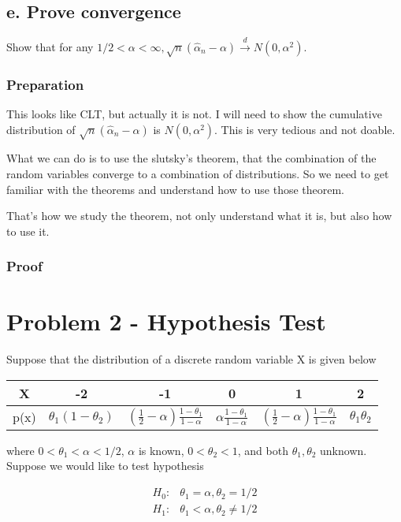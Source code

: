 \subsection{e. Prove convergence}
Show that for any $1/2 < \alpha < \infty, \sqrt{n} (\hat{\alpha}_n - \alpha) \xrightarrow {d} N(0, \alpha^2)$.

\subsubsection{Preparation}
This looks like CLT, but actually it is not. I will need to show the cumulative distribution of $\sqrt{n} (\hat{\alpha}_n - \alpha) $ is $N(0, \alpha^2)$. This is very tedious and not doable. 

What we can do is to use the slutsky's theorem, that the combination of the random variables converge to a combination of distributions. So we need to get familiar with the theorems and understand how to use those theorem. 

That's how we study the theorem, not only understand what it is, but also how to use it.

\subsubsection{Proof}



\section{Problem 2 - Hypothesis Test}
Suppose that the distribution of a discrete random variable X is given below

\begin{center}
\begin{tabular}{ c c c c c c}
 X & -2 & -1 & 0 & 1 & 2 \\ 
 \hline
p(x) & $\theta_1(1-\theta_2)$ & $(\frac{1}{2} - \alpha) \frac{1-\theta_1}{1-\alpha} $ & $ \alpha \frac{1-\theta_1}{1-\alpha} $ & $(\frac{1}{2} - \alpha) \frac{1-\theta_1}{1-\alpha}$ & $ \theta_1 \theta_2$ \\  
\end{tabular}
\end{center}

 where $0< \theta_1 < \alpha < 1/2$, $\alpha$ is known, $0< \theta_2 < 1$, and both $\theta_1, \theta_2$ unknown. Suppose we would like to test hypothesis

\begin{align*}
	H_0: &  \theta_1 = \alpha, \theta_2 = 1/2 \\
	H_1: &  \theta_1 < \alpha, \theta_2  \neq 1/2
\end{align*} 

